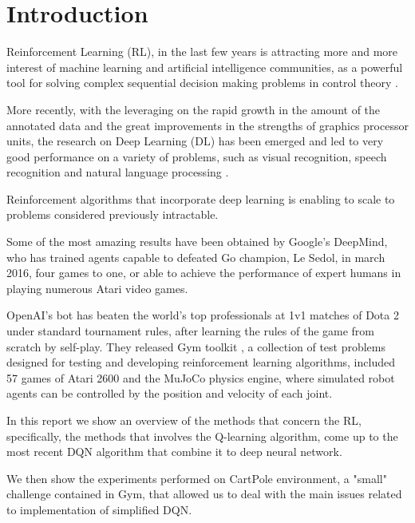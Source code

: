 \section{Introduction}

Reinforcement Learning (RL), in the last few years is attracting more and more interest of machine learning and artificial intelligence communities, as a powerful tool for solving complex sequential decision making problems in control theory \cite{GosaviRLSurvey}.

More recently, with the leveraging on the rapid growth in the amount of the annotated data and the great improvements in the strengths of graphics processor units, the research on  Deep Learning (DL) has been emerged and led to very good performance on a variety of problems, such as visual recognition, speech recognition and natural language processing \cite{AdvancesCNN}.

Reinforcement algorithms that incorporate deep learning is enabling to scale to problems considered previously intractable.

Some of the most amazing results have been obtained by Google’s DeepMind, who has trained agents capable to defeated Go champion, Le Sedol, in march 2016, four games to one, or able to achieve the performance of expert humans in playing numerous Atari video games.

OpenAI's bot has beaten the world's top professionals at 1v1 matches of Dota 2 under standard tournament rules, after learning the rules of the game from scratch by self-play.
They released Gym toolkit \cite{Gym}, a collection of test problems designed for testing and developing reinforcement learning algorithms, included 57 games of Atari 2600 and the MuJoCo physics engine, where simulated robot agents can be controlled by the position and velocity of each joint. 

In this report we show an overview of the methods that concern the RL, specifically, the methods that involves the Q-learning algorithm, come up to the most recent DQN algorithm that combine it to deep neural network.

We then show the experiments performed on CartPole environment, a "small" challenge contained in Gym, that allowed us to deal with the main issues related to implementation of simplified DQN.

